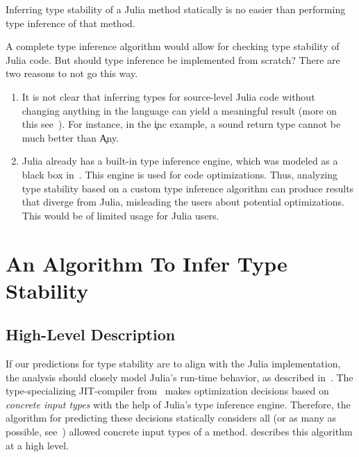 \begin{conjecture}
  Inferring type stability of a Julia method statically is no easier than
  performing type inference of that method.
\end{conjecture}

A complete type inference algorithm would allow for checking type stability of
Julia code. But should type inference be implemented from scratch? There are two reasons to
not go this way.
\begin{enumerate}

  \item It is not clear that inferring types for source-level Julia code
  without changing anything in the language
  can yield a meaningful result (more on this see~\cite{Chung23}).
  For instance, in the \c{inc} example, a sound return type cannot be
  much better than \c{Any}.

  \item Julia already has a built-in type inference engine, which 
    was modeled as a black box in~. 
    This engine is used for code optimizations. 
    Thus, analyzing type stability based on a custom type inference 
    algorithm 
    can produce results that diverge from Julia, misleading the users
    about potential optimizations.
    This would be of limited usage for Julia users.
\end{enumerate}

\section{An Algorithm To Infer Type Stability}%
\label{sec:approx:algo}

\subsection{High-Level Description}
\label{ssec:algo:high}

If our predictions for type stability are to align with the Julia
implementation, the analysis should closely model Julia's run-time behavior,
as described in~. The type-specializing JIT-compiler
from~ makes optimization decisions based on \emph{concrete
  input types} with the help of Julia's type inference engine. 
Therefore, the algorithm for
predicting these decisions statically considers all (or as many as possible,
see~) allowed concrete input types of a method.
 describes this algorithm at a high level.

